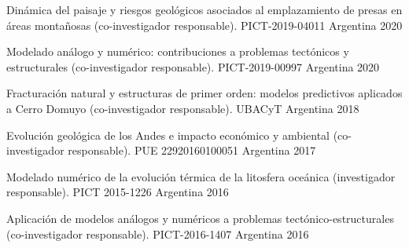\begin{cvhonors}
\cvhonor
    {Dinámica del paisaje y riesgos geológicos asociados al emplazamiento de presas en áreas montañosas (co-investigador responsable).}
    {PICT-2019-04011}
    {Argentina}
    {2020}

\cvhonor
    {Modelado análogo y numérico: contribuciones a problemas tectónicos y estructurales (co-investigador responsable).}
    {PICT-2019-00997}
    {Argentina}
    {2020}

\cvhonor
    {Fracturación natural y estructuras de primer orden: modelos predictivos aplicados a Cerro Domuyo (co-investigador responsable).}
    {UBACyT}
    {Argentina}
    {2018}

\cvhonor
    {Evolución geológica de los Andes e impacto económico y ambiental (co-investigador responsable).}
    {PUE 22920160100051}
    {Argentina}
    {2017}

\cvhonor
    {Modelado numérico de la evolución térmica de la litosfera oceánica (investigador responsable).}
    {PICT 2015-1226}
    {Argentina}
    {2016}

\cvhonor
    {Aplicación de modelos análogos y numéricos a problemas tectónico-estructurales (co-investigador responsable).}
    {PICT-2016-1407}
    {Argentina}
    {2016}

\end{cvhonors}
\endgroup
